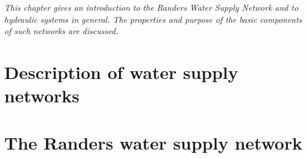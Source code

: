 \emph{This chapter gives an introduction to the Randers Water Supply Network and to hydraulic systems in general. The properties and purpose of the basic components of such networks are discussed. }

\section{Description of water supply networks}
\label{description_of_water_supply_networks}


\section{The Randers water supply network}
\label{the_randers_water_supply_network}